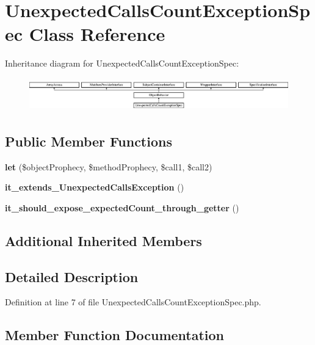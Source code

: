 \section{Unexpected\+Calls\+Count\+Exception\+Spec Class Reference}
\label{classspec_1_1_prophecy_1_1_exception_1_1_prediction_1_1_unexpected_calls_count_exception_spec}
Inheritance diagram for Unexpected\+Calls\+Count\+Exception\+Spec\+:\begin{figure}[H]
\begin{center}
\leavevmode
\includegraphics[height=1.454545cm]{classspec_1_1_prophecy_1_1_exception_1_1_prediction_1_1_unexpected_calls_count_exception_spec}
\end{center}
\end{figure}
\subsection*{Public Member Functions}
\begin{DoxyCompactItemize}
\item 
{\bf let} (\$object\+Prophecy, \$method\+Prophecy, \$call1, \$call2)
\item 
{\bf it\+\_\+extends\+\_\+\+Unexpected\+Calls\+Exception} ()
\item 
{\bf it\+\_\+should\+\_\+expose\+\_\+expected\+Count\+\_\+through\+\_\+getter} ()
\end{DoxyCompactItemize}
\subsection*{Additional Inherited Members}


\subsection{Detailed Description}


Definition at line 7 of file Unexpected\+Calls\+Count\+Exception\+Spec.\+php.



\subsection{Member Function Documentation}
